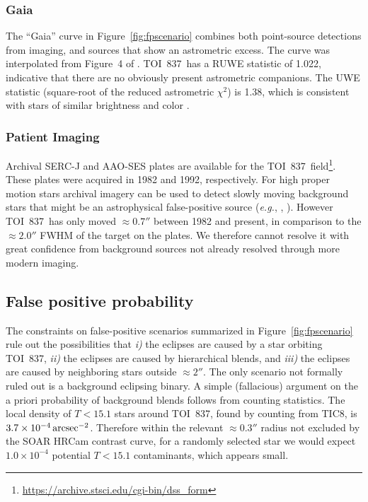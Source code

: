 \documentclass[12pt,twocolumn,tighten]{aastex63}
\newcommand{\tn}{TOI~837} %
\begin{document}
\subsubsection{Gaia}

The ``Gaia'' curve in Figure~\ref{fig:fpscenario} combines both
point-source detections from imaging, and sources that show an
astrometric excess.  The curve was interpolated from Figure~4 of
\citet{rizzuto_zeitVIII_2018}.  \tn\ has a RUWE statistic of 1.022,
indicative that there are no obviously present astrometric companions.
The UWE statistic (square-root of the reduced astrometric $\chi^2$) is
1.38, which is consistent with stars of similar brightness and color
\citep[][Appendix A]{lindegren_gaiasoln_2018}.


\subsubsection{Patient Imaging}

Archival SERC-J and AAO-SES plates are available for the \tn\
field\footnote{\url{https://archive.stsci.edu/cgi-bin/dss_form}}.
These plates were acquired in 1982 and 1992, respectively.  For high
proper motion stars archival imagery can be used to detect slowly
moving background stars that might be an astrophysical false-positive
source ({\it e.g.}, \citealt{huang_pimen_2018},
\citealt{vanderburg_hr858_2019}).  However \tn\ has only moved
$\approx0.7''$ between 1982 and present, in comparison to the
$\approx2.0''$ FWHM of the target on the plates.  We therefore cannot
resolve it with great confidence from background sources not already
resolved through more modern imaging.


\subsection{False positive probability}

The constraints on false-positive scenarios summarized in
Figure~\ref{fig:fpscenario} rule out the possibilities that {\it i)}
the eclipses are caused by a star orbiting \tn, {\it ii)} the eclipses
are caused by hierarchical blends, and {\it iii)} the eclipses are
caused by neighboring stars outside $\approx 2''$.  The only scenario
not formally ruled out is a background eclipsing binary.  A simple
(fallacious) argument on the a priori probability of background blends
follows from counting statistics.  The local density of $T<15.1$ stars
around \tn, found by counting from TIC8, is $3.7\times10^{-4} \,{\rm
arcsec}^{-2}$.  Therefore within the relevant $\approx0.3''$ radius
not excluded by the SOAR HRCam contrast curve, for a randomly selected
star we would expect $1.0\times10^{-4}$ potential $T<15.1$
contaminants, which appears small.
\end{document}
